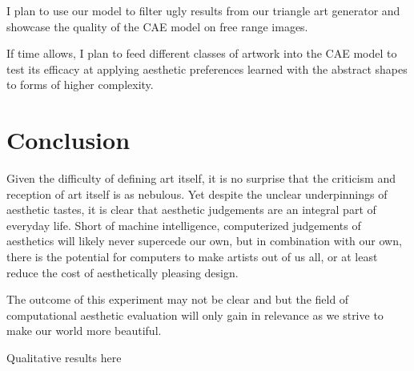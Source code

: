 \documentclass[midd]{thesis}
\begin{document}
I plan to use our model to filter ugly results from our triangle art generator and showcase the quality of the CAE model on free range images.

If time allows, I plan to feed different classes of artwork into the CAE model to test its efficacy at applying aesthetic preferences learned with the abstract shapes to forms of higher complexity.

\chapter{Conclusion}

Given the difficulty of defining art itself, it is no surprise that the criticism and reception of art itself is as nebulous. Yet despite the unclear underpinnings of aesthetic tastes, it is clear that aesthetic judgements are an integral part of everyday life. Short of machine intelligence, computerized judgements of aesthetics will likely never supercede our own, but in combination with our own, there is the potential for computers to make artists out of us all, or at least reduce the cost of aesthetically pleasing design.

The outcome of this experiment may not be clear and but the field of computational aesthetic evaluation will only gain in relevance as we strive to make our world more beautiful.


Qualitative results here

\nocite{*}

\end{document}
